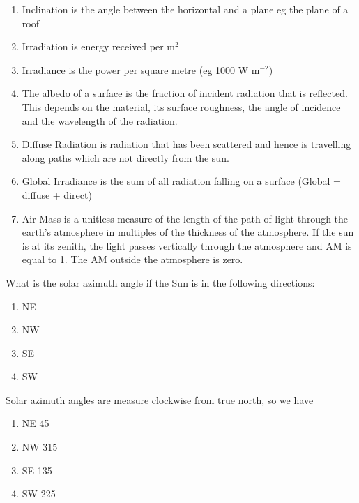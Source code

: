 \documentclass[class=scrartcl, crop=false,parskip=half]{standalone}
\begin{document}
\begin{solution}
\begin{enumerate}[label=\alph*)]
        \item Inclination is the angle between the horizontal and a plane eg the plane of a roof
        \item Irradiation is energy received per m$^2$
        \item Irradiance is the power per square metre (eg 1000 W m$^{-2}$)
        \item The albedo of a surface is the fraction of incident radiation that is reflected. This depends on the material, its surface roughness, the angle of incidence and the wavelength of the radiation.
        \item Diffuse Radiation is radiation that has been scattered and hence is travelling along paths which are not directly from the sun.
        \item Global Irradiance is the sum of all radiation falling on a surface (Global = diffuse + direct) 
        \item Air Mass is a unitless measure of the length of the path of light through  the earth's atmosphere in multiples of the thickness of the atmosphere. If the sun is at its zenith, the light passes vertically through the atmosphere and AM is equal to 1. The AM outside the atmosphere is zero.
    \end{enumerate}
\end{solution}

\begin{question}
What is the solar azimuth angle if the Sun is in the following directions:
    \begin{enumerate}
    \item NE
    \item NW
    \item SE
    \item SW
    \end{enumerate}
\end{question}
\begin{solution}
Solar azimuth angles are measure clockwise from true north, so we have
    \begin{enumerate}
    \item NE 45\degree
    \item NW 315\degree
    \item SE 135\degree
    \item SW 225\degree
    \end{enumerate}
\end{solution}
\end{document}
